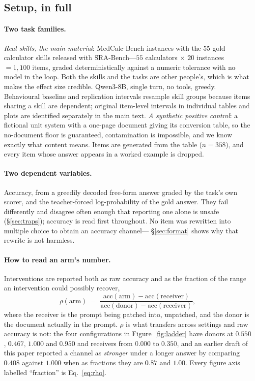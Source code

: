 \documentclass{article}
\begin{document}
\subsection{Setup, in full}
\label{app:setup}

\paragraph{Two task families.} \emph{Real skills, the main material}:
MedCalc-Bench instances with the 55 gold calculator skills released with
SRA-Bench---$55$ calculators $\times$ $20$ instances $= 1{,}100$ items, graded
deterministically against a numeric tolerance with no model in the loop. Both
the skills and the tasks are other people's, which is what makes the effect size
credible. Qwen3-8B, single turn, no tools, greedy. Behavioural baseline and replication
intervals resample skill groups because items sharing a skill are dependent;
original item-level intervals in individual tables and plots are identified
separately in the main text.
\emph{A synthetic positive control}: a fictional unit system with a one-page
document giving its conversion table, so the no-document floor is guaranteed,
contamination is impossible, and we know exactly what content means. Items are
generated from the table ($n=358$), and every item whose answer appears in a
worked example is dropped.

\paragraph{Two dependent variables.} Accuracy, from a greedily decoded free-form
answer graded by the task's own scorer, and the teacher-forced log-probability of
the gold answer. They fail differently and disagree often enough that reporting
one alone is unsafe (\S\ref{sec:traps}); accuracy is read first throughout. No
item was rewritten into multiple choice to obtain an accuracy channel---%
\S\ref{sec:format} shows why that rewrite is not harmless.

\paragraph{How to read an arm's number.} Interventions are reported both as raw
accuracy and as the fraction of the range an intervention could possibly
recover,
\begin{equation}
\rho(\text{arm}) \;=\;
\frac{\text{acc}(\text{arm}) - \text{acc}(\text{receiver})}
     {\text{acc}(\text{donor}) - \text{acc}(\text{receiver})},
\end{equation}
where the receiver is the prompt being patched into, unpatched, and the donor is
the document actually in the prompt. $\rho$ is what transfers across settings and
raw accuracy is not: the four configurations in Figure~\ref{fig:ladder} have
donors at $0.550$, $0.467$, $1.000$ and $0.950$ and receivers from $0.000$ to
$0.350$, and an earlier draft of this paper reported a channel as \emph{stronger}
under a longer answer by comparing $0.408$ against $1.000$ when as fractions
they are $0.87$ and $1.00$. Every figure axis labelled ``fraction'' is
Eq.~\ref{eq:rho}.
\end{document}
